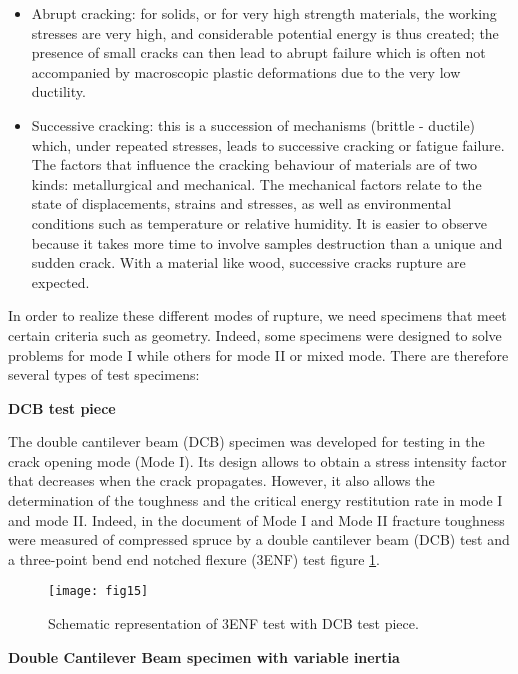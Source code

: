 \begin{itemize}
	\item Abrupt cracking: for solids, or for very high strength materials, the working stresses are very high, and considerable potential energy is thus created; the presence of small cracks can then lead to abrupt failure which is often not accompanied by macroscopic plastic deformations due to the very low ductility. 
	\item Successive cracking: this is a succession of mechanisms (brittle - ductile) which, under repeated stresses, leads to successive cracking or fatigue failure. The factors that influence the cracking behaviour of materials are of two kinds: metallurgical and mechanical. The mechanical factors relate to the state of displacements, strains and stresses, as well as environmental conditions such as temperature or relative humidity. It is easier to observe because it takes more time to involve samples destruction than a unique and sudden crack. With a material like wood, successive cracks rupture are expected.
\end{itemize}

In order to realize these different modes of rupture, we need specimens that meet certain criteria such as geometry. Indeed, some specimens were designed to solve problems for mode I while others for mode II or mixed mode. There are therefore several types of test specimens:

\smallskip

\textbf{DCB test piece}

The double cantilever beam (DCB) specimen was developed for testing in the crack opening mode (Mode I). Its design allows to obtain a stress intensity factor that decreases when the crack propagates. However, it also allows the determination of the toughness and the critical energy restitution rate in mode I and mode II. Indeed, in the document of \cite{Reference14} Mode I and Mode II fracture toughness were measured of compressed spruce by a double cantilever beam (DCB) test and a three-point bend end notched flexure (3ENF) test figure \ref{fig:fig15}.

\graphicspath{{Images/}}
\begin{figure}[htp]
	\centering
	\texttt{[image: fig15]}
	\caption{Schematic representation of 3ENF test with DCB test piece. \cite{Reference15}}
	\label{fig:fig15}
\end{figure}

\smallskip

\textbf{Double Cantilever Beam specimen with variable inertia}


